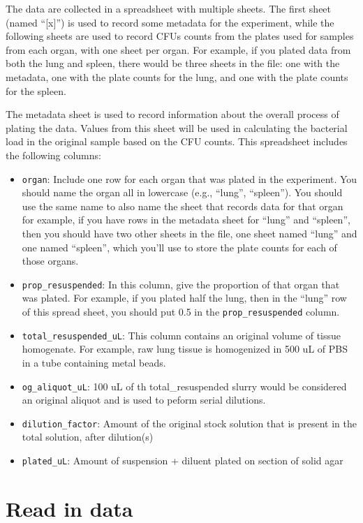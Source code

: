 \documentclass[
]{book}
\providecommand{\tightlist}{%
  \setlength{\itemsep}{0pt}\setlength{\parskip}{0pt}}
\begin{document}
The data are collected in a spreadsheet with multiple sheets. The first sheet
(named ``{[}x{]}'') is used to record some metadata for the experiment, while the
following sheets are used to record CFUs counts from the plates used for samples
from each organ, with one sheet per organ. For example, if you plated data
from both the lung and spleen, there would be three sheets in the file: one
with the metadata, one with the plate counts for the lung, and one with the
plate counts for the spleen.

The metadata sheet is used to record information about the overall process of
plating the data. Values from this sheet will be used in calculating the bacterial
load in the original sample based on the CFU counts. This spreadsheet includes
the following columns:

\begin{itemize}
\tightlist
\item
  \texttt{organ}: Include one row for each organ that was plated in the experiment.
  You should name the organ all in lowercase (e.g., ``lung'', ``spleen''). You
  should use the same name to also name the sheet that records data for that organ
  for example, if you have rows in the metadata sheet for ``lung'' and ``spleen'',
  then you should have two other sheets in the file, one sheet named ``lung'' and
  one named ``spleen'', which you'll use to store the plate counts for each of those
  organs.
\item
  \texttt{prop\_resuspended}: In this column, give the proportion of that organ that
  was plated. For example, if you plated half the lung, then in the ``lung'' row
  of this spread sheet, you should put 0.5 in the \texttt{prop\_resuspended} column.
\item
  \texttt{total\_resuspended\_uL}: This column contains an original volume of tissue homogenate. For example, raw lung tissue is homogenized in 500 uL of PBS in a tube containing metal beads.
\item
  \texttt{og\_aliquot\_uL}: 100 uL of th total\_resuspended slurry would be considered an original aliquot and is used to peform serial dilutions.
\item
  \texttt{dilution\_factor}: Amount of the original stock solution that is present in the total solution, after dilution(s)
\item
  \texttt{plated\_uL}: Amount of suspension + diluent plated on section of solid agar
\end{itemize}

\hypertarget{read-in-data-1}{%
\section{Read in data}\label{read-in-data-1}}
\end{document}
